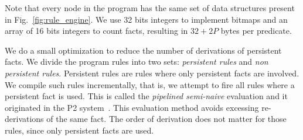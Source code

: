 Note that every node in the program has the same set of data structures present in Fig.~\ref{fig:rule_engine}.
We use 32 bits integers to implement bitmaps and an array of 16 bits integers to count facts, resulting in
$32 + 2P$ bytes per predicate.

We do a small optimization to reduce the number of derivations of persistent facts. We
divide the program rules into two sets: \emph{persistent rules} and \emph{non persistent rules}.
Persistent rules are rules where only persistent facts are involved. We compile such rules
incrementally, that is, we attempt to fire all rules where a persistent fact is used. This is called
the \emph{pipelined semi-naive} evaluation and it originated in the P2 system~\cite{Loo-condie-garofalakis-p2}.
This evaluation method avoids excessing re-derivations of the same fact. The order of derivation does not matter for those rules, since
only persistent facts are used.

